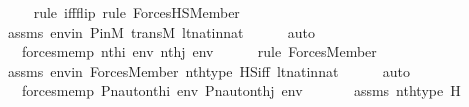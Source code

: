 \begin{isabellebody}
\ \ \ \ \isamarkupfalse%
{\isacharparenleft}{\kern0pt}rule\ iff{\isacharunderscore}{\kern0pt}flip{\isacharcomma}{\kern0pt}\ rule\ ForcesHS{\isacharunderscore}{\kern0pt}Member{\isacharparenright}{\kern0pt}\isanewline
\ \ \ \ \isamarkupfalse%
\ assms\ envin\ P{\isacharunderscore}{\kern0pt}in{\isacharunderscore}{\kern0pt}M\ transM\ lt{\isacharunderscore}{\kern0pt}nat{\isacharunderscore}{\kern0pt}in{\isacharunderscore}{\kern0pt}nat\isanewline
\ \ \ \ \isamarkupfalse%
\ auto\isanewline
\ \ \isamarkupfalse%
\ \isamarkupfalse%
\ {\isachardoublequoteopen}{\isachardot}{\kern0pt}{\isachardot}{\kern0pt}{\isachardot}{\kern0pt}\ {\isasymlongleftrightarrow}\ forces{\isacharunderscore}{\kern0pt}mem{\isacharparenleft}{\kern0pt}p{\isacharcomma}{\kern0pt}\ nth{\isacharparenleft}{\kern0pt}i{\isacharcomma}{\kern0pt}\ env{\isacharparenright}{\kern0pt}{\isacharcomma}{\kern0pt}\ nth{\isacharparenleft}{\kern0pt}j{\isacharcomma}{\kern0pt}\ env{\isacharparenright}{\kern0pt}{\isacharparenright}{\kern0pt}{\isachardoublequoteclose}\ \isanewline
\ \ \ \ \isamarkupfalse%
{\isacharparenleft}{\kern0pt}rule\ Forces{\isacharunderscore}{\kern0pt}Member{\isacharparenright}{\kern0pt}\isanewline
\ \ \ \ \isamarkupfalse%
\ assms\ envin\ Forces{\isacharunderscore}{\kern0pt}Member\ nth{\isacharunderscore}{\kern0pt}type\ HS{\isacharunderscore}{\kern0pt}iff\ lt{\isacharunderscore}{\kern0pt}nat{\isacharunderscore}{\kern0pt}in{\isacharunderscore}{\kern0pt}nat\isanewline
\ \ \ \ \isamarkupfalse%
\ auto\isanewline
\ \ \isamarkupfalse%
\ \isamarkupfalse%
\ {\isachardoublequoteopen}{\isachardot}{\kern0pt}{\isachardot}{\kern0pt}{\isachardot}{\kern0pt}\ {\isasymlongleftrightarrow}\ forces{\isacharunderscore}{\kern0pt}mem{\isacharparenleft}{\kern0pt}{\isasympi}{\isacharbackquote}{\kern0pt}p{\isacharcomma}{\kern0pt}\ Pn{\isacharunderscore}{\kern0pt}auto{\isacharparenleft}{\kern0pt}{\isasympi}{\isacharparenright}{\kern0pt}{\isacharbackquote}{\kern0pt}nth{\isacharparenleft}{\kern0pt}i{\isacharcomma}{\kern0pt}\ env{\isacharparenright}{\kern0pt}{\isacharcomma}{\kern0pt}\ Pn{\isacharunderscore}{\kern0pt}auto{\isacharparenleft}{\kern0pt}{\isasympi}{\isacharparenright}{\kern0pt}{\isacharbackquote}{\kern0pt}nth{\isacharparenleft}{\kern0pt}j{\isacharcomma}{\kern0pt}\ env{\isacharparenright}{\kern0pt}{\isacharparenright}{\kern0pt}{\isachardoublequoteclose}\ \isanewline
\ \ \ \ \isamarkupfalse%
\ assms\ nth{\isacharunderscore}{\kern0pt}type\ H\isanewline

\end{isabellebody}
